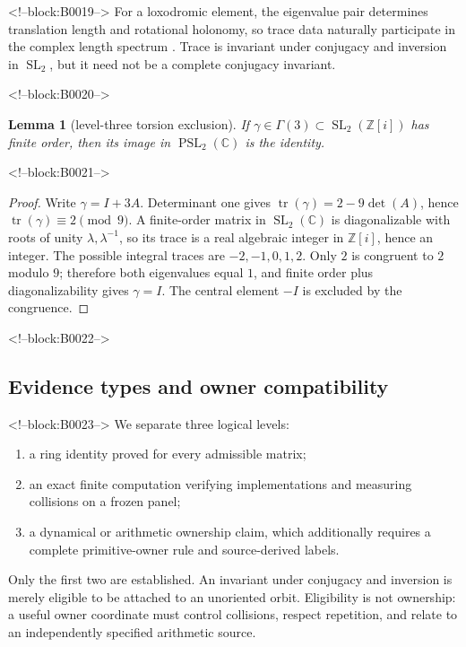 \documentclass[11pt,a4paper]{article}
\newtheorem{lemma}[theorem]{Lemma}
\theoremstyle{definition}
\theoremstyle{remark}
\newcommand{\SL}{\operatorname{SL}}
\newcommand{\tr}{\operatorname{tr}}
\newcommand{\Gauss}{\mathbb{Z}[i]}
\begin{document}
<!--block:B0019-->
For a loxodromic element, the eigenvalue pair determines translation length and rotational holonomy, so trace data naturally participate in the complex length spectrum \citep[Introduction and Sec.~2]{LinLipnowski2022}. Trace is invariant under conjugacy and inversion in \(\SL_2\), but it need not be a complete conjugacy invariant.

<!--block:B0020-->
\begin{lemma}[level-three torsion exclusion]\label{lem:torsion}
If \(\gamma\in\Gamma(3)\subset\SL_2(\Gauss)\) has finite order, then its image in \(\operatorname{PSL}_2(\mathbb C)\) is the identity.
\end{lemma}

<!--block:B0021-->
\begin{proof}
Write \(\gamma=I+3A\). Determinant one gives \(\tr(\gamma)=2-9\det(A)\), hence \(\tr(\gamma)\equiv2\pmod 9\). A finite-order matrix in \(\SL_2(\mathbb C)\) is diagonalizable with roots of unity \(\lambda,\lambda^{-1}\), so its trace is a real algebraic integer in \(\Gauss\), hence an integer. The possible integral traces are \(-2,-1,0,1,2\). Only \(2\) is congruent to \(2\) modulo \(9\); therefore both eigenvalues equal \(1\), and finite order plus diagonalizability gives \(\gamma=I\). The central element \(-I\) is excluded by the congruence.
\end{proof}

<!--block:B0022-->
\subsection{Evidence types and owner compatibility}

<!--block:B0023-->
We separate three logical levels:
\begin{enumerate}[label=(\roman*)]
 \item a ring identity proved for every admissible matrix;
 \item an exact finite computation verifying implementations and measuring collisions on a frozen panel;
 \item a dynamical or arithmetic ownership claim, which additionally requires a complete primitive-owner rule and source-derived labels.
\end{enumerate}
Only the first two are established. An invariant under conjugacy and inversion is merely eligible to be attached to an unoriented orbit. Eligibility is not ownership: a useful owner coordinate must control collisions, respect repetition, and relate to an independently specified arithmetic source.
\end{document}
